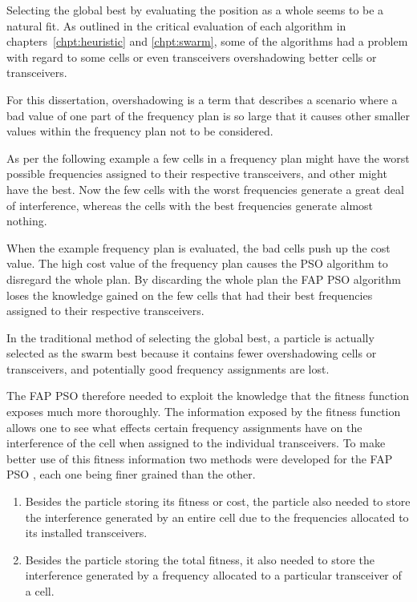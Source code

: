 Selecting the global best by evaluating the position as a whole seems to be a natural fit. As outlined in the critical evaluation of each algorithm in chapters~\ref{chpt:heuristic} and \ref{chpt:swarm}, some of the algorithms had a problem with regard to some cells or even transceivers overshadowing better cells or transceivers.

For this dissertation, overshadowing is a term that describes a scenario where a bad value of one part of the frequency plan is so large that it causes other smaller values within the frequency plan not to be considered. 

As per the following example a few cells in a frequency plan might have the worst possible frequencies assigned to their respective transceivers, and other might have the best. Now the few cells with the worst frequencies generate a great deal of interference, whereas the cells with the best frequencies generate almost nothing.

When the example frequency plan is evaluated, the bad cells push up the cost value. The high cost value of the frequency plan causes the \gls{PSO} algorithm to disregard the whole plan. By discarding the whole plan the \gls{FAP} \gls{PSO} algorithm loses the knowledge gained on the few cells that had their best frequencies assigned to their respective transceivers.

In the traditional method of selecting the global best, a particle is actually selected as the swarm best because it contains fewer overshadowing cells or transceivers, and potentially good frequency assignments are lost.

The \gls{FAP} \gls{PSO} therefore needed to exploit the knowledge that the fitness function exposes much more thoroughly. The information exposed by the fitness function allows one to see what effects certain frequency assignments have on the interference of the cell when assigned to the individual transceivers. To make better use of this fitness information two methods were developed for the \gls{FAP} \gls{PSO} , each one being finer grained than the other.

\begin{enumerate}
\item Besides the particle storing its fitness or cost, the particle also needed to store the interference generated by an entire cell due to the frequencies allocated to its installed transceivers.
\item Besides the particle storing the total fitness, it also needed to store the interference generated by a frequency allocated to a particular transceiver of a cell.
\end{enumerate}

